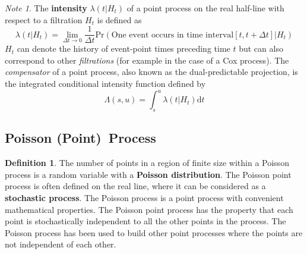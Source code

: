 \documentclass[12pt]{article}
\theoremstyle{plain}
\theoremstyle{definition}
\newtheorem{definition}{Definition}
\theoremstyle{remark}
\newtheorem*{note}{Note}
\begin{document}
\begin{note}
  The \textbf{intensity} $\lambda(t|H_t)$ of a point process on the real
  half-line with respect to a filtration $H_t$ is defined as
  \begin{equation*}
    \lambda(t|H_t) = \lim_{\Delta t \to 0} \frac{1}{\Delta t} \mathrm{Pr}
    (\text{One event occurs in time interval} [t, t+\Delta t] | H_t)
  \end{equation*}
  $H_t$ can denote the history of event-point times preceding time $t$ but can
  also correspond to other \emph{filtrations} (for example in the case of a Cox
  process).
  The \emph{compensator} of a point process, also known as the dual-predictable
  projection, is the integrated conditional intensity function defined by
  \begin{equation*}
    \Lambda(s,u) = \int_s^u \lambda(t|H_t)\mathrm{d}t
  \end{equation*}
\end{note}

\subsection[Poisson Process]{Poisson (Point)\footnotemark\ Process}


\begin{definition}
  The number of points in a region of finite size within a Poisson process is
  a random variable with a \textbf{Poisson distribution}.
  The Poisson point process is often defined on the real line, where it can be
  considered as a \textbf{stochastic process}.
  The Poisson process is a point process with convenient mathematical
  properties.
  The Poisson point process has the property that each point is stochastically
  independent to all the other points in the process.
  The Poisson process has been used to build other point processes where the
  points are not independent of each other.
\end{definition}
\end{document}
